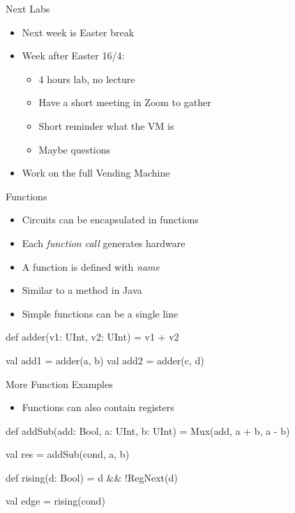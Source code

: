 \begin{frame}[fragile]{Next Labs}
\begin{itemize}
\item Next week is Easter break
\item Week after Easter 16/4:
\begin{itemize}
\item 4 hours lab, no lecture
\item Have a short meeting in Zoom to gather
\item Short reminder what the VM is
\item Maybe questions
\end{itemize}
\item Work on the full Vending Machine
\end{itemize}
\end{frame}

\begin{frame}[fragile]{Functions}
\begin{itemize}
\item Circuits can be encapsulated in functions
\item Each \emph{function call} generates hardware
\item A function is defined with  \emph{name}
\item Similar to a method in Java
\item Simple functions can be a single line
\end{itemize}
\begin{chisel}
  def adder(v1: UInt, v2: UInt) = v1 + v2
  
  val add1 = adder(a, b)
  val add2 = adder(c, d)
\end{chisel}
\end{frame}

\begin{frame}[fragile]{More Function Examples}
\begin{itemize}
\item Functions can also contain registers
\end{itemize}
\begin{chisel}
  def addSub(add: Bool, a: UInt, b: UInt) =
    Mux(add, a + b, a - b)

  val res = addSub(cond, a, b)

  def rising(d: Bool) = d && !RegNext(d)

  val edge = rising(cond)
\end{chisel}
\end{frame}


